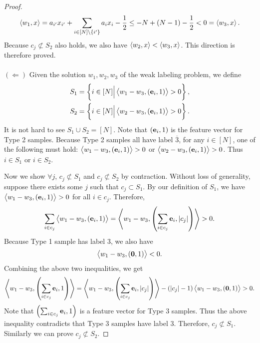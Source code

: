\begin{proof}
 \begin{align*}
     \left\langle w_1, x \right\rangle= a_{i'}x_{i'} + \sum_{i\in [N]\backslash\{i'\}} a_ix_i - \frac{1}{2} \leq -N + (N-1)-\frac{1}{2} < 0 = \left\langle w_3, x \right\rangle. 
 \end{align*}
 Because $c_j \not\subset S_2$ also holds, we also have $\left\langle w_2, x \right\rangle<\left\langle w_3, x \right\rangle$. This direction is therefore proved. \\
 \ \\
 $(\Longleftarrow)$ Given the solution $w_1, w_2, w_3$ of the weak labeling problem, we define 
 \begin{align*}
     S_1 = \left\{i\in [N] \Big| \left\langle w_1-w_3, (\mathbf{e}_i, 1) \right\rangle > 0 \right\}, \\
     S_2 = \left\{i\in [N] \Big| \left\langle w_2-w_3, (\mathbf{e}_i, 1) \right\rangle > 0 \right\}.
 \end{align*}
 It is not hard to see $S_1\cup S_2 = [N]$. Note that $(\mathbf{e}_i, 1)$ is the feature vector for Type 2 samples. Because Type 2 samples all have label $\overline{3}$, for any $i\in [N]$, one of the following must hold: $\left\langle w_1-w_3, (\mathbf{e}_i, 1) \right\rangle>0$ or $\left\langle w_2-w_3, (\mathbf{e}_i, 1) \right\rangle>0$. Thus $i\in S_1$ or $i\in S_2$. 
 
 Now we show $\forall j$, $c_j \not\subset S_1$ and $c_j \not\subset S_2$ by contraction. Without loss of generality, suppose there exists some $j$ such that $c_j \subset S_1$. By our definition of $S_1$, we have $\left\langle w_1-w_3, (\mathbf{e}_i, 1) \right\rangle > 0$ for all $i\in c_j$. Therefore, 
 \begin{align*}
     \sum_{i\in c_j}\left\langle w_1-w_3, \left(\mathbf{e}_i, 1\right) \right\rangle = \left\langle w_1-w_3, \left(\sum_{i\in c_j}\mathbf{e}_i, |c_j|\right) \right\rangle > 0. 
 \end{align*}
 Because Type 1 sample has label $3$, we also have
 \begin{align*}
     \left\langle w_1-w_3, \left(\mathbf{0}, 1\right) \right\rangle < 0. 
 \end{align*}
 Combining the above two inequalities, we get
 \begin{align*}
     \left\langle w_1-w_3, \left(\sum_{i\in c_j}\mathbf{e}_i, 1\right) \right\rangle = \left\langle w_1-w_3, \left(\sum_{i\in c_j}\mathbf{e}_i, |c_j|\right) \right\rangle - (|c_j|-1)\left\langle w_1-w_3, \left(\mathbf{0}, 1\right) \right\rangle>0.  
 \end{align*}
 Note that $\left(\sum_{i\in c_j}\mathbf{e}_i, 1\right)$ is a feature vector for Type 3 samples. Thus the above inequality contradicts that Type 3 samples have label 3. Therefore, $c_j \not\subset S_1$. Similarly we can prove $c_j \not\subset S_2$. 
\end{proof}